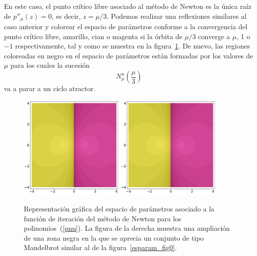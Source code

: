 En este caso, el punto crítico libre asociado al método de Newton es la única raíz de $p''_{\mu}(z)=0$, es decir, $z=\mu/3$. Podemos realizar una reflexiones similares al caso anterior y colorear el espacio de parámetros conforme a la convergencia del punto crítico libre, amarillo, cian o magenta si la órbita de $\mu/3$ converge a 
$\mu$, 1 o $-1$ respectivamente, tal y como se muestra en la figura~\ref{esparam_fig1}.  De nuevo, las regiones coloreadas en negro en el espacio de parámetros están formadas por los valores de $\mu$ para los cuales la sucesión
$$
N_{\mu}^{n}\left(\frac{\mu}{3}\right)
$$ 
va a parar a  un ciclo atractor.

\begin{figure}[htb]
\centering
\includegraphics[width=0.45\textwidth]{NDfigura0.pdf}
\qquad
 \includegraphics[width=0.45\textwidth]{NDfigura0.pdf}
\caption{Representación gráfica del espacio de parámetros asociado a la función de iteración del método de Newton para los polinomios~(\ref{pnu}). La figura de la derecha muestra una ampliación de una zona negra en la que se aprecia un conjunto de tipo Mandelbrot similar al de la figura~\ref{esparam_fig0}.}
\label{esparam_fig1}
\end{figure}




